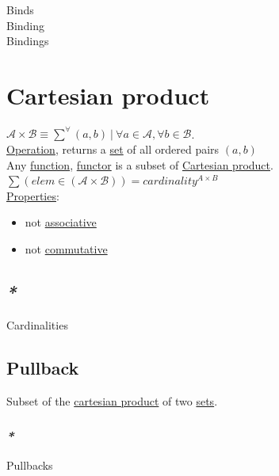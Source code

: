 \documentclass[a4paper,14pt,oneside]{book}
\begin{document}
\label{org7f1cb06}Binds\\
\label{orgac1c0eb}Binding\\
\label{orgd9263d0}Bindings\\

\chapter{\label{orge75e0a1}Cartesian product}
\label{sec:org09925da}
\(\mathcal{A} \times \mathcal{B} \equiv \sum^{\forall}{(a,b)} \ | \ \forall a \in \mathcal{A}, \forall b \in \mathcal{B}\).\\
\hyperref[org6ed0c27]{Operation}, returns a \hyperref[orge119629]{set} of all ordered pairs \((a, b)\)\\

Any \hyperref[org8cc2ae4]{function}, \hyperref[orge5e236e]{functor} is a subset of \hyperref[orge75e0a1]{Cartesian product}.\\

\(\sum{(elem \in (\mathcal{A} \times \mathcal{B}))}  = cardinality^{A \times B}\)\\

\hyperref[org1feb373]{Properties}:\\
\begin{itemize}
\item not \hyperref[org1621588]{associative}\\
\item not \hyperref[orga3b086e]{commutative}\\
\end{itemize}

\section{\emph{*}}
\label{sec:orgf68a66c}

\label{org805655a}Cardinalities\\

\section{\label{org479b009}Pullback}
\label{sec:org4111a64}
Subset of the \hyperref[orge75e0a1]{cartesian product} of two \hyperref[org1faae0f]{sets}.\\

\subsection{\emph{*}}
\label{sec:org0f7ae9f}
\label{orgc7570b3}Pullbacks\\
\end{document}
